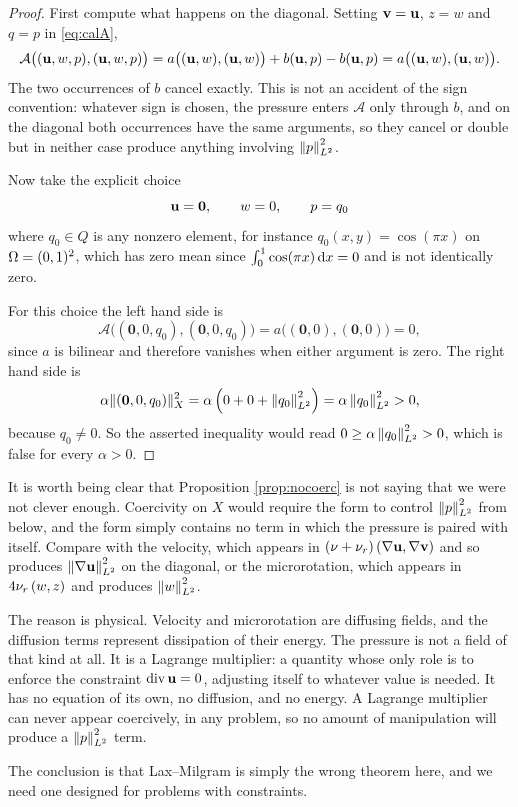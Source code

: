 \documentclass[11pt,a4paper]{article}
\newcommand{\Qsp}{Q}
\newcommand{\Xsp}{X}
\newcommand{\bzero}{\mathbf{0}}
\begin{document}
\begin{proof}
First compute what happens on the diagonal. Setting $\mathbf{v} = \mathbf{u}$, $z = w$ and
$q = p$ in \eqref{eq:calA},
\[
  \mathcal{A}\big( (\mathbf{u},w,p),(\mathbf{u},w,p) \big)
  = a\big( (\mathbf{u},w),(\mathbf{u},w) \big) + b(\mathbf{u},p) - b(\mathbf{u},p)
  = a\big( (\mathbf{u},w),(\mathbf{u},w) \big) .
\]
The two occurrences of $b$ cancel exactly. This is not an accident of the sign
convention: whatever sign is chosen, the pressure enters $\mathcal{A}$ only
through $b$, and on the diagonal both occurrences have the same arguments, so
they cancel or double but in neither case produce anything involving
$\left\lVert p \right\rVert_{L^{2}}^{2}$.

Now take the explicit choice
\[
  \bu = \bzero , \qquad w = 0 , \qquad p = q_{0}
\]
where $q_{0} \in \Qsp$ is any nonzero element, for instance
$q_{0}(x,y) = \cos(\pi x)$ on $\Omega = (0,1)^{2}$, which has zero mean since
$\int_{0}^{1}\cos(\pi x) \,\mathrm{d}x = 0$ and is not identically zero.

For this choice the left hand side is
\[
  \mathcal{A}\big( (\bzero,0,q_{0}),(\bzero,0,q_{0}) \big)
  = a\big( (\bzero,0),(\bzero,0) \big) = 0 ,
\]
since $a$ is bilinear and therefore vanishes when either argument is zero. The
right hand side is
\[
  \alpha \lVert (\bzero,0,q_{0}) \rVert_{\Xsp}^{2}
  = \alpha \left( 0 + 0 + \normL{q_{0}}^{2} \right)
  = \alpha \normL{q_{0}}^{2} > 0 ,
\]
because $q_{0} \neq 0$. So the asserted inequality would read $0 \ge \alpha
\left\lVert q_{0} \right\rVert_{L^{2}}^{2} > 0$, which is false for every $\alpha > 0$.
\end{proof}

\begin{remark}
It is worth being clear that Proposition \ref{prop:nocoerc} is not saying that
we were not clever enough. Coercivity on $\Xsp$ would require the form to
control $\left\lVert p \right\rVert_{L^{2}}^{2}$ from below, and the form simply contains no term in
which the pressure is paired with itself. Compare with the velocity, which
appears in $(\nu+\nu_{r})\left( \nabla \mathbf{u} , \nabla \mathbf{v} \right)$ and so produces
$\left\lVert \nabla \mathbf{u} \right\rVert_{L^{2}}^{2}$ on the diagonal, or the microrotation, which appears in
$4\nu_{r}\left( w , z \right)$ and produces $\left\lVert w \right\rVert_{L^{2}}^{2}$.

The reason is physical. Velocity and microrotation are diffusing fields, and the
diffusion terms represent dissipation of their energy. The pressure is not a
field of that kind at all. It is a Lagrange multiplier: a quantity whose only
role is to enforce the constraint $\operatorname{div} \mathbf{u} = 0$, adjusting itself to whatever
value is needed. It has no equation of its own, no diffusion, and no energy. A
Lagrange multiplier can never appear coercively, in any problem, so no amount of
manipulation will produce a $\left\lVert p \right\rVert_{L^{2}}^{2}$ term.

The conclusion is that Lax--Milgram is simply the wrong theorem here, and we
need one designed for problems with constraints.
\end{remark}
\end{document}
